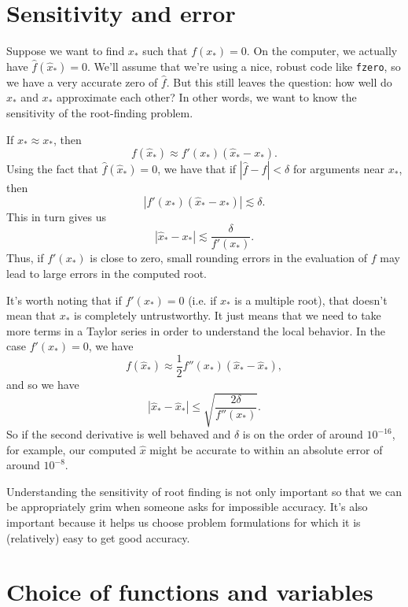 \documentclass[12pt, leqno]{article} %
\begin{document}
\section*{Sensitivity and error}


Suppose we want to find $x_*$ such that $f(x_*) = 0$.  On the
computer, we actually have $\hat{f}(\hat{x}_*) = 0$.  We'll assume
that we're using a nice, robust code like {\tt fzero}, so we have a
very accurate zero of $\hat{f}$.  But this still leaves the question:
how well do $\hat{x}_*$ and $x_*$ approximate each other?
In other words, we want to know the sensitivity of the root-finding
problem.

If $\hat{x}_* \approx x_*$, then 
\[
  f(\hat{x}_*) \approx f'(x_*) (\hat{x}_*-x_*).
\]
Using the fact that $\hat{f}(\hat{x}_*) = 0$, we have that if
$|\hat{f}-f| < \delta$ for arguments near $x_*$, then
\[
  |f'(x_*) (\hat{x}_*-x_*)| \lesssim \delta.
\]
This in turn gives us
\[
  |\hat{x}_*-x_*| \lesssim \frac{\delta}{f'(x_*)}.
\]
Thus, if $f'(x_*)$ is close to zero, small rounding errors in the
evaluation of $f$ may lead to large errors in the computed root.

It's worth noting that if $f'(x_*) = 0$ (i.e. if $x_*$ is a multiple
root), that doesn't mean that $x_*$ is completely untrustworthy.  It
just means that we need to take more terms in a Taylor series in order
to understand the local behavior.  In the case $f'(x_*) = 0$, we have
\[
  f(\hat{x}_*) \approx \frac{1}{2} f''(x_*) (\hat{x}_*-\hat{x}_*),
\]
and so we have
\[
  |\hat{x}_*-\hat{x}_*| \leq \sqrt{\frac{2\delta}{f''(x_*)}}.
\]
So if the second derivative is well behaved and $\delta$ is on the
order of around $10^{-16}$, for example, our computed $\hat{x}$ might
be accurate to within an absolute error of around $10^{-8}$.

Understanding the sensitivity of root finding is not only important so
that we can be appropriately grim when someone asks for impossible
accuracy.  It's also important because it helps us choose problem
formulations for which it is (relatively) easy to get good accuracy.

\section*{Choice of functions and variables}
\end{document}
